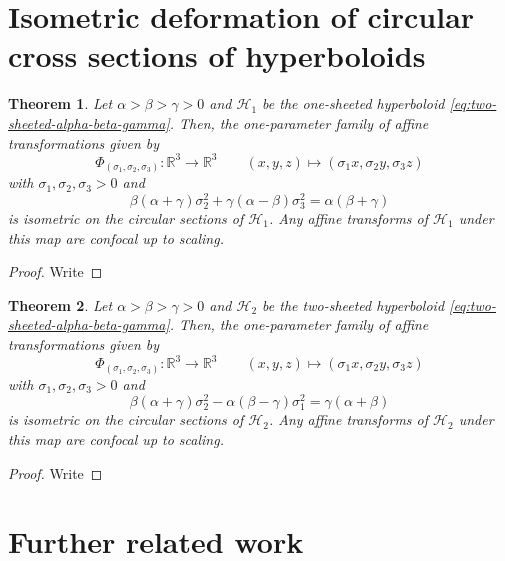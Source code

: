 \documentclass[10pt, a4paper]{article}
\theoremstyle{BoldTopSpacing}
\newtheorem{theorem}{Theorem}[section]
\theoremstyle{BoldTopSpacing}
\theoremstyle{BoldTopSpacing}
\theoremstyle{BoldTopBottomSpacing}
\theoremstyle{BoldTopSpacing}
\theoremstyle{BoldTopBottomSpacing}
\theoremstyle{remark}
\begin{document}
\section{Isometric deformation of circular cross sections of hyperboloids}
\begin{theorem}
\label{thm:affine-transformation-one-sheeted}
Let $\alpha > \beta > \gamma > 0$ and $\mathcal{H}_{1}$ be the one-sheeted hyperboloid \eqref{eq:two-sheeted-alpha-beta-gamma}. Then, the one-parameter family of affine transformations given by
\[
    \Phi_{(\sigma_1, \sigma_2, \sigma_3)} : \mathbb{R}^3 \to \mathbb{R}^3 \quad \quad (x, y, z) \mapsto (\sigma_{1}x, \sigma_{2}y, \sigma_{3}z)
\]
with $\sigma_{1}, \sigma_{2}, \sigma_{3} > 0$ and
\begin{equation}
    \beta(\alpha + \gamma) \sigma_{2}^2 + \gamma(\alpha - \beta) \sigma_{3}^2 = \alpha (\beta + \gamma)
\end{equation}
is isometric on the circular sections of $\mathcal{H}_1$. Any affine transforms of $\mathcal{H}_1$ under this map are confocal up to scaling.
\end{theorem}
\begin{proof}
    Write
\end{proof}

\begin{theorem}
\label{thm:affine-transformation-two-hyperboloid}
Let $\alpha > \beta > \gamma > 0$ and $\mathcal{H}_{2}$ be the two-sheeted hyperboloid \eqref{eq:two-sheeted-alpha-beta-gamma}. Then, the one-parameter family of affine transformations given by
\[
    \Phi_{(\sigma_1, \sigma_2, \sigma_3)} : \mathbb{R}^3 \to \mathbb{R}^3 \quad \quad (x, y, z) \mapsto (\sigma_{1}x, \sigma_{2}y, \sigma_{3}z)
\]
with $\sigma_{1}, \sigma_{2}, \sigma_{3} > 0$ and
\begin{equation}
    \beta (\alpha + \gamma) \sigma_{2}^2 - \alpha (\beta - \gamma) \sigma_{1}^2 = \gamma (\alpha + \beta)
\end{equation}
is isometric on the circular sections of $\mathcal{H}_2$. Any affine transforms of $\mathcal{H}_2$ under this map are confocal up to scaling.
\end{theorem}
\begin{proof}
    Write
\end{proof}
\section{Further related work}
\label{sec:further-related-work}
\end{document}
